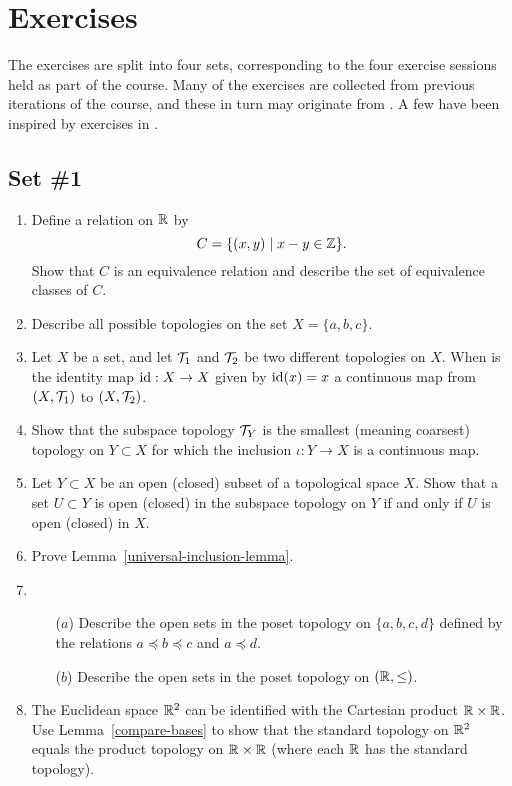 \section{Exercises}
The exercises are split into four sets, corresponding to the four exercise sessions held as part of the course. Many of the exercises are collected from previous iterations of the course, and these in turn may originate from \cite{Mun}. A few have been inspired by exercises in \cite{DM}.

\subsection{Set \#1}
\begin{enumerate}[label=1.\arabic*]
  \item Define a relation on $\mathbb{R}$ by
    \[
      C=\{(x,y) \mid x - y \in \mathbb{Z} \}.
    \]
    Show that $C$ is an equivalence relation and describe the set of equivalence classes of $C$.
  \item Describe all possible topologies on the set $X = \{a,b,c\}$.
  \item Let $X$ be a set, and let $\mathcal{T}_1$ and $\mathcal{T}_2$ be two different topologies on $X$. When is the identity map $\mathrm{id} : X \to X$ given by $\mathrm{id}(x) = x$ a continuous map from $(X,\mathcal{T}_1)$ to $(X,\mathcal{T}_2)$.
  \item
		Show that the subspace topology $\mathcal{T}_Y$ is the smallest (meaning coarsest) topology on $Y\subset X$ for which the inclusion $\iota:Y \rightarrow X$ is a continuous map.
	
	\item \label{opens-in-opens} Let $Y\subset X$ be an open (closed) subset of a topological space $X$. Show that a set $U \subset Y$ is open (closed) in the subspace topology on $Y$ if and only if $U$ is open (closed) in $X$.
	
	\item \label{universal-inclusion} Prove Lemma~\ref{universal-inclusion-lemma}.
	
  \item \begin{itemize}
		\item[($a$)] Describe the open sets in the poset topology on $\{a,b,c,d\}$ defined by the relations $a\preceq b\preceq c$ and $a\preceq d$.
		\item[($b$)] Describe the open sets in the poset topology on $(\mathbb{R},\leq)$.
	\end{itemize}
	
  \item The Euclidean space $\mathbb{R}^2$ can be identified with the Cartesian product $\mathbb{R} \times \mathbb{R}$. Use Lemma~\ref{compare-bases} to show that the standard topology on $\mathbb{R}^2$ equals the product topology on $\mathbb{R} \times \mathbb{R}$ (where each $\mathbb{R}$ has the standard topology).
  


\end{enumerate}
